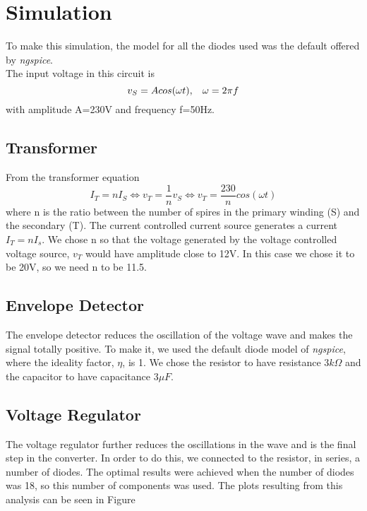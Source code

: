 \section{Simulation}
\label{sec:sim}
To make this simulation, the model for all the diodes used was the default offered by \textit{ngspice}. \\
The input voltage in this circuit is 
\begin{equation}
v_S=Acos(\omega t),\hspace{3mm} \omega=2\pi f
\end{equation}
with amplitude A=230V and frequency f=50Hz.
\subsection{Transformer}
From the transformer equation 
\begin{equation}
  I_T=nI_S\Leftrightarrow v_T=\frac{1}{n}v_S \Leftrightarrow v_T=\frac{230}{n}cos(\omega t)
\end{equation}
where n is the ratio between the number of spires in the primary winding (S) and the secondary (T).
The current controlled current source generates a current $I_T=nI_s$. We chose n so that the voltage generated by the voltage controlled voltage source, $v_T$ would have amplitude close to 12V. In this case we chose it to be 20V, so we need n to be 11.5.\\
\subsection{Envelope Detector}
The envelope detector reduces the oscillation of the voltage wave and makes the signal totally positive.  To make it, we used the default diode model of \textit{ngspice}, where the ideality factor, $\eta$, is 1. We chose the resistor to have resistance $3k\Omega$ and the capacitor to have capacitance $3\mu F$.\\
\subsection{Voltage Regulator}
The voltage regulator further reduces the oscillations in the wave and is the final step in the converter. In order to do this, we connected to the resistor, in series, a number of diodes. The optimal results were achieved when the number of diodes was 18, so this number of components was used. 
The plots resulting from this analysis can be seen in Figure